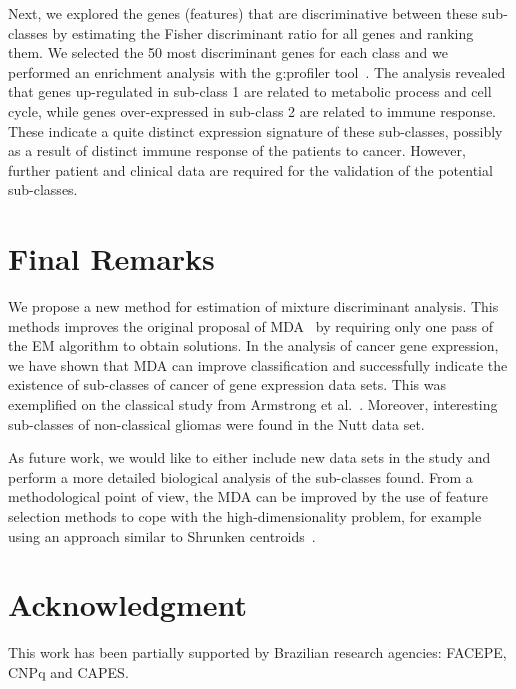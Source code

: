\documentclass[runningheads,a4paper]{llncs}
\begin{document}
Next, we explored the genes (features) that are discriminative between
these sub-classes by estimating the Fisher discriminant ratio for all
genes and ranking them. We selected the 50 most discriminant genes for
each class and we performed an enrichment analysis with the g:profiler
tool~\cite{Reimand2007}.  The analysis revealed that genes
up-regulated in sub-class 1 are related to metabolic process and cell
cycle, while genes over-expressed in sub-class 2 are related to immune
response. These indicate a quite distinct expression signature of
these sub-classes, possibly as a result of distinct immune response of
the patients to cancer.  However, further patient and clinical data
are required for the validation of the potential sub-classes.

\section{Final Remarks}

We propose a new method for estimation of mixture discriminant
analysis. This methods improves the original proposal of
MDA~\cite{Hastie1996} by requiring only one pass of the EM algorithm
to obtain solutions. In the analysis of cancer gene expression, we
have shown that MDA can improve classification and successfully
indicate the existence of sub-classes of cancer of gene expression
data sets. This was exemplified on the classical study from Armstrong
et al.~\cite{Armstrong2002}. Moreover, interesting sub-classes of
non-classical gliomas were found in the Nutt data set. 

As future work, we would like to either include new data sets in the
study and perform a more detailed biological analysis of the
sub-classes found. From a methodological point of view, the MDA can be
improved by the use of feature selection methods to cope with the
high-dimensionality problem, for example using an approach similar to
Shrunken centroids~\cite{Tibshirani2002}.

\section*{Acknowledgment}

This work has been partially supported by Brazilian research agencies:
FACEPE, CNPq and CAPES.




\end{document}
